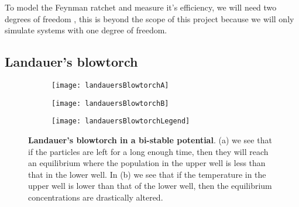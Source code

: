To model the Feynman ratchet and measure it's efficiency, we will need two degrees of freedom \cite{M.W.Jack2016}, this is beyond the scope of this project because we will only simulate systems with one degree of freedom.

\subsection{Landauer's blowtorch} \label{landauersBlowtorch}
\begin{figure}[tb]
	\begin{subfigure}{0.42\textwidth}
		\texttt{[image: landauersBlowtorchA]}
		\caption{\label{fig:landauerA}}
	\end{subfigure}
	\begin{subfigure}{0.42\textwidth}
		\texttt{[image: landauersBlowtorchB]}
		\caption{\label{fig:landauerB}}
	\end{subfigure}
	\begin{subfigure}{0.12\textwidth}
		\texttt{[image: landauersBlowtorchLegend]}
	\end{subfigure}

\caption{\textbf{Landauer's blowtorch in a bi-stable potential}. (a) we see that if the particles are left for a long enough time, then they will reach an equilibrium where the population in the upper well is less than that in the lower well. In (b) we see that if the temperature in the upper well is lower than that of the lower well, then the equilibrium concentrations are drastically altered.}
\label{fig:landauersBlowtorch}
\end{figure}
